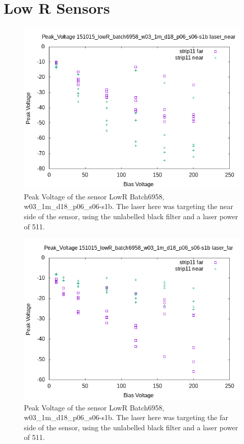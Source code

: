 \documentclass{report}
\begin{document}
        \section{Low R Sensors}
            \begin{figure}[h] 
                \includegraphics[height=.4\textheight]{Peak_Voltage__151015_lowR_batch6958_w03_1m_d18_p06_s06-s1b__laser_near}
                \centering
                \caption{ Peak Voltage of the sensor LowR Batch6958, w03\_1m\_d18\_p06\_s06-s1b. The laser here was targeting the near side of the sensor, using the unlabelled black filter and a laser power of 511. }
                \label{fig:Peak_Voltage__151015_lowR_batch6958_w03_1m_d18_p06_s06-s1b__laser_near}
            \end{figure}

            \begin{figure}[h] 
                \includegraphics[height=.4\textheight]{Peak_Voltage__151015_lowR_batch6958_w03_1m_d18_p06_s06-s1b__laser_far}
                \centering
                \caption{ Peak Voltage of the sensor LowR Batch6958, w03\_1m\_d18\_p06\_s06-s1b. The laser here was targeting the far side of the sensor, using the unlabelled black filter and a laser power of 511. }
                \label{fig:Peak_Voltage__151015_lowR_batch6958_w03_1m_d18_p06_s06-s1b__laser_far}
            \end{figure}
\end{document}
